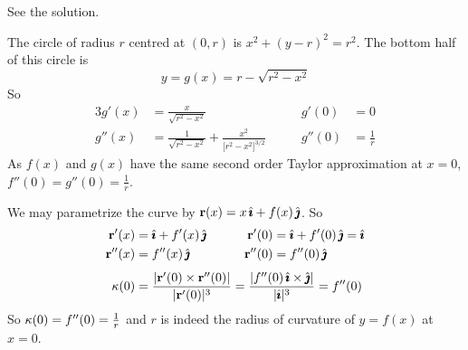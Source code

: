
\begin{answer}
See the solution.
\end{answer}

\begin{solution}
The circle  of radius $r$ centred at $(0,r)$ is $x^2+(y-r)^2 = r^2$.
The bottom half of this circle is 
\begin{equation*}
y = g(x) = r - \sqrt{r^2-x^2}
\end{equation*}
So
\begin{alignat*}{3}
g'(x) &=\frac{x}{\sqrt{r^2-x^2}} &
g'(0) &=0 \\
g''(x)&=\frac{1}{\sqrt{r^2-x^2}} +\frac{x^2}{[{r^2-x^2]}^{3/2}}\qquad &
g''(0)&=\frac{1}{r}
\end{alignat*}
As $f(x)$ and $g(x)$ have the same second order Taylor approximation at $x=0$,
$f''(0) = g''(0) = \frac{1}{r}$. 

We may parametrize the curve by $\mathbf{r}(x) = x\,\hat{\pmb{\imath}} + f(x)\,\hat{\pmb{\jmath}}$.
So
\begin{alignat*}{3}
\vr'(x)& = \hi +f'(x)\,\hj\qquad &
\vr'(0)& = \hi +f'(0)\,\hj = \hi \\
\vr''(x)& = f''(x)\,\hj &
\vr''(0)& = f''(0)\,\hj \\[0.05in]
\ka(0)& = \frac{|\vr'(0)\times\vr''(0)|}{|\vr'(0)|^3}
 = \frac{|f''(0)\,\hi\times\hj|}{|\hi|^3}
=f''(0)\hidewidth
\end{alignat*}
So $\kappa(0)=f''(0)=\frac{1}{r}$ and $r$ is indeed the radius of curvature
of $y=f(x)$ at $x=0$.
\end{solution}


